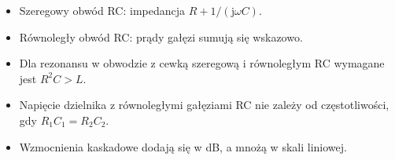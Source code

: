\documentclass[12pt,a4paper]{article}
\newcommand{\jw}{\mathrm{j}\omega}
\begin{document}
\begin{itemize}

    \item Szeregowy obwód RC:
    impedancja $R+1/(\jw C)$.

    \item Równoległy obwód RC:
    prądy gałęzi sumują się wskazowo.

    \item Dla rezonansu w obwodzie z cewką szeregową
    i równoległym RC wymagane jest $R^2C>L$.

    \item Napięcie dzielnika z równoległymi gałęziami RC
    nie zależy od częstotliwości, gdy
    $R_1C_1=R_2C_2$.

    \item Wzmocnienia kaskadowe dodają się w dB,
    a mnożą w skali liniowej.

\end{itemize}
\end{document}

